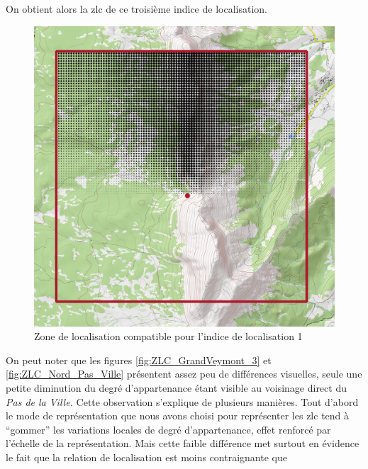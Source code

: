 On obtient alors la \ac{zlc} de ce troisième indice de localisation.

\begin{figure}
  \centering
  \includegraphics{../figures/NordExterne_PasVille_GrandVeymont.png}
  \caption{Zone de localisation compatible pour l'indice de
    localisation 1}
  \label{fig:ZLC_GrandVeymont_3}
\end{figure}

On peut noter que les figures \autoref{fig:ZLC_GrandVeymont_3} et
\autoref{fig:ZLC_Nord_Pas_Ville} présentent assez peu de différences
visuelles, seule une petite diminution du degré d'appartenance étant
visible au voisinage direct du \emph{Pas de la Ville.} Cette
observation s'explique de plusieurs manières. Tout d'abord le mode de
représentation que nous avons choisi pour représenter les \ac{zlc}
tend à \enquote{gommer} les variations locales de degré
d'appartenance, effet renforcé par l'échelle de la
représentation. Mais cette faible différence met surtout en évidence
le fait que la relation de localisation
 est moins contraignante que 


